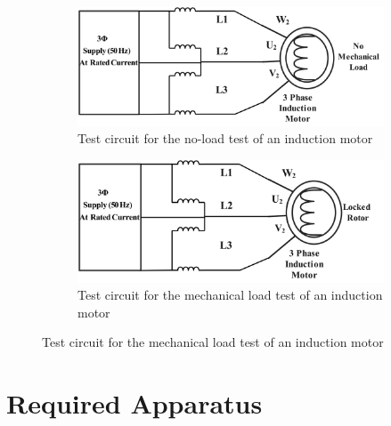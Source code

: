 \documentclass[a4paper,12pt]{article}
\begin{document}
		\begin{figure}[H]
		\centering
		\begin{subfigure}[t]{0.9\textwidth}
			\centering
			\includegraphics[width=1\textwidth]{Images/2}
			\caption{Test circuit for the no-load test of an induction motor}
			\vspace{0.1cm}
		\end{subfigure}
	
		\begin{subfigure}[t]{0.9\textwidth}
			\centering
			\includegraphics[width=1\textwidth]{Images/1}
			\caption{Test circuit for the mechanical load test of an induction motor}
		\end{subfigure}
	\end{figure}
	
\section{Required Apparatus}
\end{document}
